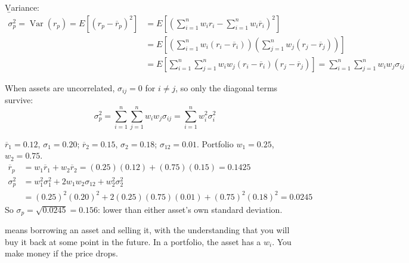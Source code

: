 \b{Variance}:
\begin{align*}
    \sigma_p^2 = \operatorname{Var}(r_p) = E\left[(r_p - \overline{r}_p)^2\right] &= E\left[\left(\sum_{i=1}^{n}w_ir_i - \sum_{i=1}^{n}w_i\overline{r}_i\right)^2\right]\\
    &= E\left[\left(\sum_{i=1}^{n}w_i(r_i - \overline{r}_i)\right)\left(\sum_{j=1}^{n}w_j(r_j - \overline{r}_j)\right)\right]\\
    &= E\left[\sum_{i=1}^{n}\sum_{j=1}^{n}w_iw_j(r_i - \overline{r}_i)(r_j - \overline{r}_j)\right] = \sum_{i=1}^{n}\sum_{j=1}^{n}w_iw_j\sigma_{ij}
\end{align*}


\begin{example}
    When assets are uncorrelated, $\sigma_{ij} = 0$ for $i \neq j$, so only the diagonal terms survive:
    \[\sigma_p^2 = \sum_{i=1}^{n}\sum_{j=1}^{n}w_iw_j\sigma_{ij} = \sum_{i=1}^{n}w_i^2\sigma_i^2\]
\end{example}

\begin{example}
    $\overline{r}_1 = 0.12$, $\sigma_1 = 0.20$; $\overline{r}_2 = 0.15$, $\sigma_2 = 0.18$; $\sigma_{12} = 0.01$. Portfolio $w_1 = 0.25$, $w_2 = 0.75$.
    \begin{align*}
        \overline{r}_p &= w_1\overline{r}_1 + w_2\overline{r}_2 = (0.25)(0.12) + (0.75)(0.15) = 0.1425\\
        \sigma_p^2 &= w_1^2\sigma_1^2 + 2w_1w_2\sigma_{12} + w_2^2\sigma_2^2\\
        &= (0.25)^2(0.20)^2 + 2(0.25)(0.75)(0.01) + (0.75)^2(0.18)^2 = 0.0245
    \end{align*}
    So $\sigma_p = \sqrt{0.0245} = 0.156$: lower than either asset's own standard deviation.
\end{example}

 means borrowing an asset and selling it, with the understanding that you will buy it back at some point in the future. In a portfolio, the asset has a  $w_i$. You make money if the price drops.
\begin{center}
\end{center}

